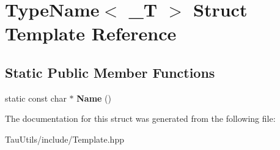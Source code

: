 \hypertarget{struct_type_name}{}\section{Type\+Name$<$ \+\_\+T $>$ Struct Template Reference}
\label{struct_type_name}
\subsection*{Static Public Member Functions}
\begin{DoxyCompactItemize}
\item 
\mbox{\label{struct_type_name_ab7d1e1a476a249512f1809d907ca93b3}} 
static const char $\ast$ {\bfseries Name} ()
\end{DoxyCompactItemize}


The documentation for this struct was generated from the following file\+:\begin{DoxyCompactItemize}
\item 
Tau\+Utils/include/Template.\+hpp\end{DoxyCompactItemize}
